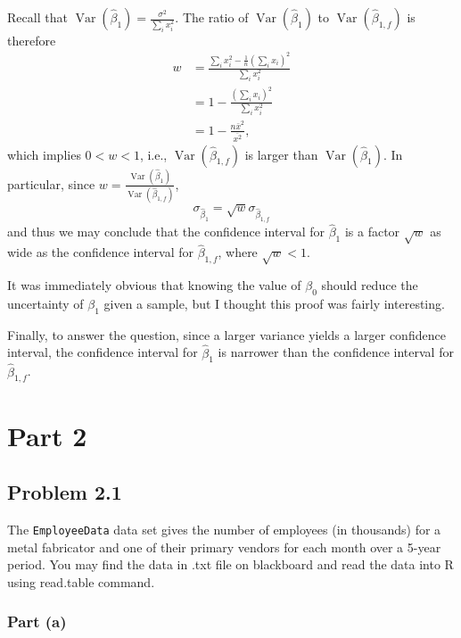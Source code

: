 \documentclass[
]{article}
\begin{document}
Recall that
\(\operatorname{Var}(\hat\beta_1) = \frac{\sigma^2}{\sum_i x_i^2}\). The
ratio of \(\operatorname{Var}(\hat\beta_1)\) to
\(\operatorname{Var}(\hat\beta_{1,f})\) is therefore \begin{align*}
   w  &= \frac{\sum_i x_i^2 - \frac{1}{n}\left(\sum_i x_i\right)^2}{\sum_i x_i^2}\\
      &= 1 - \frac{\left(\sum_i x_i\right)^2}{\sum_i x_i^2}\\
      &= 1 - \frac{n \bar{x}^2}{\overline{x^2}},
\end{align*} which implies \(0 < w < 1\), i.e.,
\(\operatorname{Var}(\hat\beta_{1,f})\) is larger than
\(\operatorname{Var}(\hat\beta_1)\). In particular, since
\(w = \frac{\operatorname{Var}(\hat\beta_1)}{\operatorname{Var}(\hat\beta_{1,f})}\),
\[
   \sigma_{\hat\beta_1} = \sqrt{w} \sigma_{\hat\beta_{1,f}}
\] and thus we may conclude that the confidence interval for
\(\hat\beta_1\) is a factor \(\sqrt{w}\) as wide as the confidence
interval for \(\hat\beta_{1,f}\), where \(\sqrt{w} < 1\).

It was immediately obvious that knowing the value of \(\beta_0\) should
reduce the uncertainty of \(\beta_1\) given a sample, but I thought this
proof was fairly interesting.

Finally, to answer the question, since a larger variance yields a larger
confidence interval, the confidence interval for \(\hat\beta_1\) is
narrower than the confidence interval for \(\hat\beta_{1,f}\).

\hypertarget{part-2}{%
\section{Part 2}\label{part-2}}

\hypertarget{problem-2.1}{%
\subsection{Problem 2.1}\label{problem-2.1}}

The \texttt{EmployeeData} data set gives the number of employees (in
thousands) for a metal fabricator and one of their primary vendors for
each month over a 5-year period. You may find the data in .txt file on
blackboard and read the data into R using read.table command.

\hypertarget{part-a-3}{%
\subsubsection{Part (a)}\label{part-a-3}}
\end{document}
